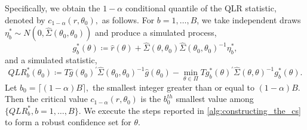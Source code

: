 Specifically, we obtain the $1-\alpha $ conditional quantile of the QLR statistic, denoted by $c_{1-\alpha }(r,\theta _{0}),$ as follows. For $b=1,\ldots,B$, we take independent draws $\eta _{b}^{\ast }\sim N(0,\widehat{\Sigma }(\theta _{0},\theta _{0}))$ and produce a simulated process, 
%
\begin{equation}
    g_{b}^{\ast }(\theta ) \coloneqq \widehat{r}(\theta )+\widehat{\Sigma }(\theta ,\theta _{0})\widehat{\Sigma }(\theta _{0},\theta _{0})^{-1}\eta _{b}^{\ast},
\end{equation}
%
and a simulated statistic,
%
\begin{equation}
    QLR_{b}^{\ast }(\theta _{0}) \coloneqq T\widehat{g}(\theta _{0})^{\prime }\widehat{\Sigma }(\theta _{0},\theta _{0})^{-1}\widehat{g}(\theta _{0})-\underset{\theta \in \Pi }{\min }Tg_{b}^{\ast }(\theta )^{\prime }\widehat{\Sigma } (\theta ,\theta )^{-1}g_{b}^{\ast }(\theta ).
\end{equation}
%
Let $b_{0}=\lceil (1-\alpha )B\rceil ,$ the smallest integer greater than or equal to $(1-\alpha )B$. Then the critical value $c_{1-\alpha }(r,\theta _{0})$ is the $b_{0}^{th}$ smallest value among $\{QLR_{b}^{\ast },b=1,\ldots,B\}$.
We execute the steps reported in \cref{alg:constructing_the_cs} to form a robust confidence set for $\theta$.

